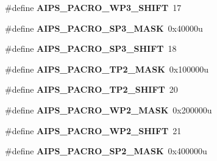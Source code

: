 \begin{DoxyCompactItemize}
\item 
\#define {\bfseries A\+I\+P\+S\+\_\+\+P\+A\+C\+R\+O\+\_\+\+W\+P3\+\_\+\+S\+H\+I\+FT}~17\hypertarget{group__AIPS__Register__Masks_ga8f9139cc9fc7c0c5d65c246c78857bed}{}\label{group__AIPS__Register__Masks_ga8f9139cc9fc7c0c5d65c246c78857bed}

\item 
\#define {\bfseries A\+I\+P\+S\+\_\+\+P\+A\+C\+R\+O\+\_\+\+S\+P3\+\_\+\+M\+A\+SK}~0x40000u\hypertarget{group__AIPS__Register__Masks_gad13bb308b2282ee4490af56fb40a076a}{}\label{group__AIPS__Register__Masks_gad13bb308b2282ee4490af56fb40a076a}

\item 
\#define {\bfseries A\+I\+P\+S\+\_\+\+P\+A\+C\+R\+O\+\_\+\+S\+P3\+\_\+\+S\+H\+I\+FT}~18\hypertarget{group__AIPS__Register__Masks_gafa8a0c0600098f63e8e87911043de6ff}{}\label{group__AIPS__Register__Masks_gafa8a0c0600098f63e8e87911043de6ff}

\item 
\#define {\bfseries A\+I\+P\+S\+\_\+\+P\+A\+C\+R\+O\+\_\+\+T\+P2\+\_\+\+M\+A\+SK}~0x100000u\hypertarget{group__AIPS__Register__Masks_ga2d960342689efa66853c4197932feef2}{}\label{group__AIPS__Register__Masks_ga2d960342689efa66853c4197932feef2}

\item 
\#define {\bfseries A\+I\+P\+S\+\_\+\+P\+A\+C\+R\+O\+\_\+\+T\+P2\+\_\+\+S\+H\+I\+FT}~20\hypertarget{group__AIPS__Register__Masks_ga97553189904ef25430ecdc72a8c2f5d3}{}\label{group__AIPS__Register__Masks_ga97553189904ef25430ecdc72a8c2f5d3}

\item 
\#define {\bfseries A\+I\+P\+S\+\_\+\+P\+A\+C\+R\+O\+\_\+\+W\+P2\+\_\+\+M\+A\+SK}~0x200000u\hypertarget{group__AIPS__Register__Masks_ga4dfb64bd463f84591d6040388c7caf87}{}\label{group__AIPS__Register__Masks_ga4dfb64bd463f84591d6040388c7caf87}

\item 
\#define {\bfseries A\+I\+P\+S\+\_\+\+P\+A\+C\+R\+O\+\_\+\+W\+P2\+\_\+\+S\+H\+I\+FT}~21\hypertarget{group__AIPS__Register__Masks_ga1773aa6de3588e8e57376ab3e2d4545d}{}\label{group__AIPS__Register__Masks_ga1773aa6de3588e8e57376ab3e2d4545d}

\item 
\#define {\bfseries A\+I\+P\+S\+\_\+\+P\+A\+C\+R\+O\+\_\+\+S\+P2\+\_\+\+M\+A\+SK}~0x400000u\hypertarget{group__AIPS__Register__Masks_ga808d6652239c69efc277cac5a0c8475f}{}\label{group__AIPS__Register__Masks_ga808d6652239c69efc277cac5a0c8475f}


\end{DoxyCompactItemize}
